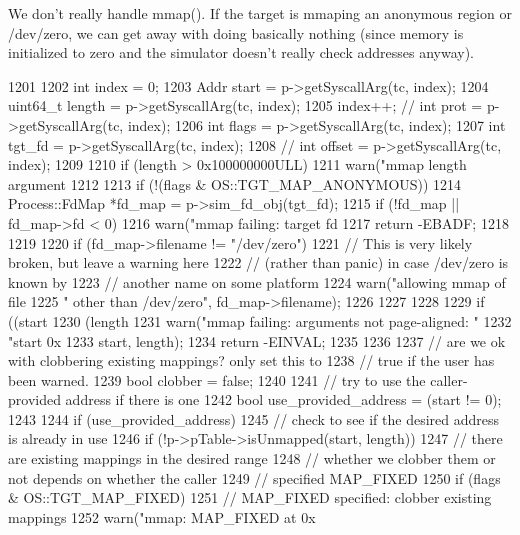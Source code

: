 We don't really handle mmap(). If the target is mmaping an anonymous region or /dev/zero, we can get away with doing basically nothing (since memory is initialized to zero and the simulator doesn't really check addresses anyway). 


\begin{DoxyCode}
1201 {
1202     int index = 0;
1203     Addr start = p->getSyscallArg(tc, index);
1204     uint64_t length = p->getSyscallArg(tc, index);
1205     index++; // int prot = p->getSyscallArg(tc, index);
1206     int flags = p->getSyscallArg(tc, index);
1207     int tgt_fd = p->getSyscallArg(tc, index);
1208     // int offset = p->getSyscallArg(tc, index);
1209 
1210     if (length > 0x100000000ULL)
1211         warn("mmap length argument %
1212 
1213     if (!(flags & OS::TGT_MAP_ANONYMOUS)) {
1214         Process::FdMap *fd_map = p->sim_fd_obj(tgt_fd);
1215         if (!fd_map || fd_map->fd < 0) {
1216             warn("mmap failing: target fd %
1217             return -EBADF;
1218         }
1219 
1220         if (fd_map->filename != "/dev/zero") {
1221             // This is very likely broken, but leave a warning here
1222             // (rather than panic) in case /dev/zero is known by
1223             // another name on some platform
1224             warn("allowing mmap of file %
1225                  " other than /dev/zero\n", fd_map->filename);
1226         }
1227     }
1228 
1229     if ((start  %
1230         (length %
1231         warn("mmap failing: arguments not page-aligned: "
1232              "start 0x%
1233              start, length);
1234         return -EINVAL;
1235     }
1236 
1237     // are we ok with clobbering existing mappings?  only set this to
1238     // true if the user has been warned.
1239     bool clobber = false;
1240 
1241     // try to use the caller-provided address if there is one
1242     bool use_provided_address = (start != 0);
1243 
1244     if (use_provided_address) {
1245         // check to see if the desired address is already in use
1246         if (!p->pTable->isUnmapped(start, length)) {
1247             // there are existing mappings in the desired range
1248             // whether we clobber them or not depends on whether the caller
1249             // specified MAP_FIXED
1250             if (flags & OS::TGT_MAP_FIXED) {
1251                 // MAP_FIXED specified: clobber existing mappings
1252                 warn("mmap: MAP_FIXED at 0x%
}}}
\end{DoxyCode}
